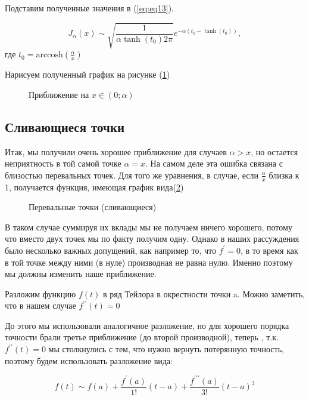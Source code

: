 \documentclass[14pt]{extarticle}
\newcommand{\arccosh}{\mathrm{arccosh}}
\begin{document}
Подставим полученные значения в (\ref{eq:eq13}).

\begin{equation}\label{eq:eq20}
J_\alpha(x) \sim \sqrt{\frac{1}{\alpha \tanh(t_0) 2 \pi}} e^{-\alpha(t_0 - \tanh(t_0))},
\end{equation}
где $t_0 = \arccosh(\frac{\alpha}{x})$

Нарисуем полученный график на рисунке (\ref{ris:image9})

\begin{figure}[h]
	\caption{Приближение на $x \in (0; \alpha)$}
	\label{ris:image9}
\end{figure}



\subsection{Сливающиеся точки}
Итак, мы получили очень хорошее приближение для случаев $\alpha>x$, но остается неприятность в той самой точке $\alpha = x$. На самом деле эта ошибка связана с близостью перевальных точек.\cite{Fedoryuk} Для того же уравнения, в случае, если $\frac{\alpha}{x}$ близка к 1, получается функция, имеющая график вида(\ref{ris:image6})

\begin{figure}[h]
	\caption{Перевальные точки (сливающиеся)}
	\label{ris:image6}
\end{figure}

В таком случае суммируя их вклады мы не получаем ничего хорошего, потому что вместо двух точек мы по факту получим одну. Однако в наших рассуждения было несколько важных допущений, как например то, что $f^{\prime} = 0$, в то время как в той точке между ними (в нуле) производная не равна нулю. Именно поэтому мы должны изменить наше приближение.

Разложим функцию $f(t)$ в ряд Тейлора в окрестности точки a. Можно заметить, что в нашем случае  $f^{\prime\prime}(t) = 0$

До этого мы использовали аналогичное разложение, но для хорошего порядка точности брали третье приближение (до второй производной), теперь , т.к. $f^{\prime\prime}(t) = 0$ мы столкнулись с тем, что нужно вернуть потерянную точность, поэтому будем использовать разложение вида:

\begin{equation}\label{eq:eq17}
f(t) \sim f(a) + \frac{f^{\prime}(a)}{1!}(t-a) + \frac{f^{\prime\prime\prime}(a)}{3!}(t-a)^3
\end{equation}
\end{document}
